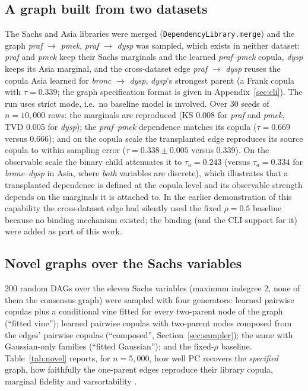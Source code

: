 \documentclass[
  english,
  class=report,
  accentcolor=2c,
  marginpar=false,
  parskip=half-,
  fontsize=11pt,
  ruledheaders=false,
  pdfa=false,
  IMRAD=false,
  thesis={type=master}
]{tudapub}
\begin{document}
\subsection{A graph built from two datasets}
The Sachs and Asia libraries were merged
(\texttt{DependencyLibrary.merge}) and the graph \emph{praf} $\to$
\emph{pmek}, \emph{praf} $\to$ \emph{dysp} was sampled, which exists in
neither dataset: \emph{praf} and \emph{pmek} keep their Sachs marginals and
the learned \emph{praf}--\emph{pmek} copula, \emph{dysp} keeps its Asia
marginal, and the cross-dataset edge \emph{praf} $\to$ \emph{dysp} reuses
the copula Asia learned for \emph{bronc} $\to$ \emph{dysp}, \emph{dysp}'s
strongest parent (a Frank copula with $\tau = 0.339$; the graph
specification format is given in Appendix~\ref{sec:cli}). The run uses strict
mode, i.e.\ no baseline model is involved. Over 30 seeds of $n = 10{,}000$
rows: the marginals are reproduced (KS 0.008 for \emph{praf} and
\emph{pmek}, TVD 0.005 for \emph{dysp}); the \emph{praf}--\emph{pmek}
dependence matches its copula ($\tau = 0.669$ versus 0.666); and on the
copula scale the transplanted edge reproduces its source copula to within
sampling error ($\tau = 0.338 \pm 0.005$ versus 0.339). On the observable scale the
binary child attenuates it to $\tau_a = 0.243$ (versus $\tau_a = 0.334$ for
\emph{bronc}--\emph{dysp} in Asia, where \emph{both} variables are
discrete), which illustrates that a transplanted dependence is defined at
the copula level and its observable strength depends on the marginals it
is attached to. In the earlier demonstration of this capability the
cross-dataset edge had silently used the fixed $\rho = 0.5$ baseline
because no binding mechanism existed; the binding (and the CLI support for
it) were added as part of this work.

\subsection{Novel graphs over the Sachs variables}
200 random DAGs over the eleven Sachs variables (maximum indegree 2, none
of them the consensus graph) were sampled with four generators: learned
pairwise copulas plus a conditional vine fitted for every two-parent node
of the graph (``fitted vine''); learned pairwise copulas with two-parent
nodes composed from the edges' pairwise copulas (``composed'',
Section~\ref{sec:sampler}); the same with Gaussian-only families (``fitted
Gaussian''); and the fixed-$\rho$ baseline. Table~\ref{tab:novel} reports,
for $n = 5{,}000$, how well PC recovers the \emph{specified} graph, how
faithfully the one-parent edges reproduce their library copula, marginal
fidelity and varsortability \parencite{reisach2021}.
\end{document}
